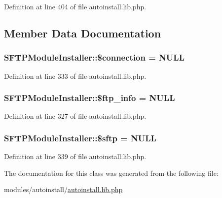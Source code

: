 Definition at line 404 of file autoinstall.\-lib.\-php.



\subsection{Member Data Documentation}
\hypertarget{classSFTPModuleInstaller_a469153f66f7c46047f51a6e99cd560ba}{
\subsubsection[{\$connection}]{\setlength{\rightskip}{0pt plus 5cm}S\-F\-T\-P\-Module\-Installer\-::\$connection = N\-U\-L\-L}}\label{classSFTPModuleInstaller_a469153f66f7c46047f51a6e99cd560ba}


Definition at line 333 of file autoinstall.\-lib.\-php.

\hypertarget{classSFTPModuleInstaller_a9c6b08191ecc35a10ed025b02d337b41}{
\subsubsection[{\$ftp\-\_\-info}]{\setlength{\rightskip}{0pt plus 5cm}S\-F\-T\-P\-Module\-Installer\-::\$ftp\-\_\-info = N\-U\-L\-L}}\label{classSFTPModuleInstaller_a9c6b08191ecc35a10ed025b02d337b41}


Definition at line 327 of file autoinstall.\-lib.\-php.

\hypertarget{classSFTPModuleInstaller_aafcf5a295a98403473988943b073838c}{
\subsubsection[{\$sftp}]{\setlength{\rightskip}{0pt plus 5cm}S\-F\-T\-P\-Module\-Installer\-::\$sftp = N\-U\-L\-L}}\label{classSFTPModuleInstaller_aafcf5a295a98403473988943b073838c}


Definition at line 339 of file autoinstall.\-lib.\-php.



The documentation for this class was generated from the following file\-:\begin{DoxyCompactItemize}
\item 
modules/autoinstall/\hyperlink{autoinstall_8lib_8php}{autoinstall.\-lib.\-php}\end{DoxyCompactItemize}
